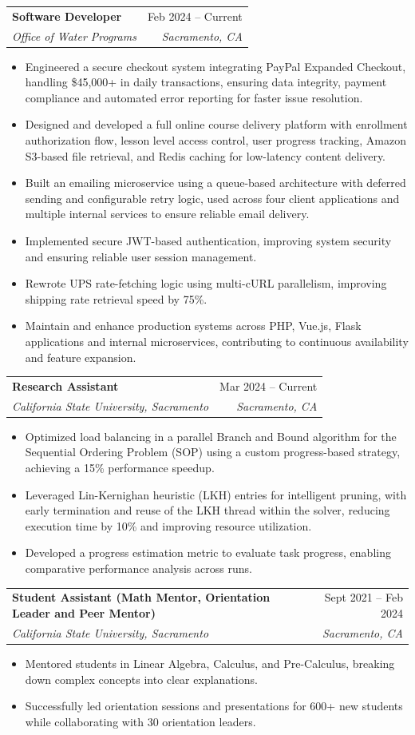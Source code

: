 \documentclass[letterpaper,11pt]{article}
\makeatletter
\newcommand{\resumeItem}[1]{
  \item\small{
    {#1 \vspace{-2pt}}
  }
}
\newcommand{\resumeSubheading}[4]{
  \vspace{-2pt}\item
    \begin{tabular*}{0.97\textwidth}[t]{l@{\extracolsep{\fill}}r}
      \textbf{#1} & #2 \\
      \textit{\small#3} & \textit{\small #4} \\
    \end{tabular*}\vspace{-7pt}
}
\newcommand{\resumeItemListStart}{\begin{itemize}}
\newcommand{\resumeItemListEnd}{\end{itemize}\vspace{-5pt}}
\makeatother
\begin{document}
    \resumeSubheading
      {Software Developer}{Feb 2024 -- Current}
      {Office of Water Programs}{Sacramento, CA}
      \resumeItemListStart
        \resumeItem{Engineered a secure checkout system integrating PayPal Expanded Checkout, handling \$45,000+ in daily transactions, ensuring data integrity, payment compliance and automated error reporting for faster issue resolution.}
        \resumeItem{Designed and developed a full online course delivery platform with enrollment authorization flow, lesson level access control, user progress tracking, Amazon S3-based file retrieval, and Redis caching for low-latency content delivery.}
        \resumeItem{Built an emailing microservice using a queue-based architecture with deferred sending and configurable retry logic, used across four client applications and multiple internal services to ensure reliable email delivery.}
        \resumeItem{Implemented secure JWT-based authentication, improving system security and ensuring reliable user session management.}
        \resumeItem{Rewrote UPS rate-fetching logic using multi-cURL parallelism, improving shipping rate retrieval speed by 75\%.}
        \resumeItem{Maintain and enhance production systems across PHP, Vue.js, Flask applications and internal microservices, contributing to continuous availability and feature expansion.}
      \resumeItemListEnd

    \resumeSubheading
      {Research Assistant}{Mar 2024 -- Current}
      {California State University, Sacramento}{Sacramento, CA}
      \resumeItemListStart
        \resumeItem{Optimized load balancing in a parallel Branch and Bound algorithm for the Sequential Ordering Problem (SOP) using a custom progress-based strategy, achieving a 15\% performance speedup.}
        \resumeItem{Leveraged Lin-Kernighan heuristic (LKH) entries for intelligent pruning, with early termination and reuse of the LKH thread within the solver, reducing execution time by 10\% and improving resource utilization.}
        \resumeItem{Developed a progress estimation metric to evaluate task progress, enabling comparative performance analysis across runs.}
      \resumeItemListEnd

    \resumeSubheading
      {Student Assistant (Math Mentor, Orientation Leader and Peer Mentor)}{Sept 2021 -- Feb 2024}
      {California State University, Sacramento}{Sacramento, CA}
      \resumeItemListStart
        \resumeItem{Mentored students in Linear Algebra, Calculus, and Pre-Calculus, breaking down complex concepts into clear explanations.}
        \resumeItem{Successfully led orientation sessions and presentations for 600+ new students while collaborating with 30 orientation leaders.}
      \resumeItemListEnd
\end{document}
